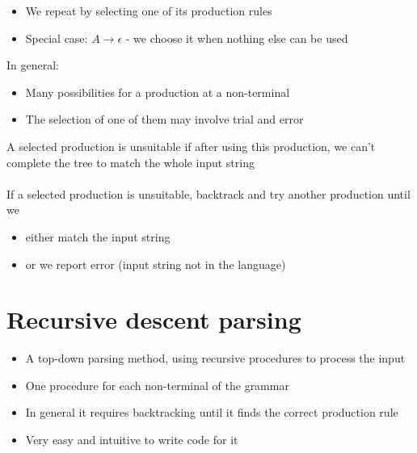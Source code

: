 \documentclass{article}[18pt]
\begin{document}
\begin{itemize}
	\item We repeat by selecting one of its production rules
	\item Special case: $A\rightarrow \epsilon$ - we choose it when nothing else can be used
\end{itemize}
In general:
\begin{itemize}
	\item Many possibilities for a production at a non-terminal
	\item The selection of one of them may involve trial and error
\end{itemize}
A selected production is unsuitable if after using this production, we can't complete the tree to match the whole input string\\
\\
If a selected production is unsuitable, backtrack and try another production until we 
\begin{itemize}
	\item either match the input string
	\item or we report error (input string not in the language)
\end{itemize}
\section{Recursive descent parsing}
\begin{itemize}
	\item A top-down parsing method, using recursive procedures to process the input
	\item One procedure for each non-terminal of the grammar
	\item In general it requires backtracking until it finds the correct production rule
	\item Very easy and intuitive to write code for it
\end{itemize}
\end{document}
